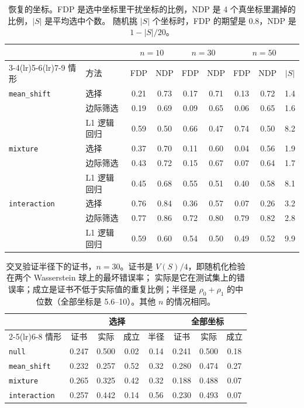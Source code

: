 \documentclass[11pt,a4paper,fontset=none]{ctexart}
\theoremstyle{definition}
\begin{document}
\begin{table}[htbp]
\centering\small
\begin{tabular}{llccccccc}
\toprule
& & \multicolumn{2}{c}{$n=10$} & \multicolumn{2}{c}{$n=30$} & \multicolumn{3}{c}{$n=50$}\\
\cmidrule(lr){3-4}\cmidrule(lr){5-6}\cmidrule(lr){7-9}
情形 & 方法 & FDP & NDP & FDP & NDP & FDP & NDP & $|S|$\\
\midrule
\texttt{mean\_shift} & 选择 & 0.21 & 0.73 & 0.17 & 0.71 & 0.13 & 0.72 & 1.4\\
& 边际筛选 & 0.19 & 0.69 & 0.09 & 0.65 & 0.06 & 0.65 & 1.6\\
& L1 逻辑回归 & 0.59 & 0.50 & 0.66 & 0.47 & 0.74 & 0.50 & 8.2\\
\texttt{mixture} & 选择 & 0.37 & 0.70 & 0.11 & 0.60 & 0.04 & 0.56 & 1.9\\
& 边际筛选 & 0.43 & 0.72 & 0.15 & 0.67 & 0.07 & 0.64 & 1.7\\
& L1 逻辑回归 & 0.45 & 0.68 & 0.55 & 0.51 & 0.40 & 0.58 & 8.1\\
\texttt{interaction} & 选择 & 0.76 & 0.84 & 0.36 & 0.57 & 0.07 & 0.26 & 3.2\\
& 边际筛选 & 0.77 & 0.86 & 0.72 & 0.80 & 0.79 & 0.82 & 2.8\\
& L1 逻辑回归 & 0.59 & 0.60 & 0.54 & 0.50 & 0.49 & 0.52 & 9.9\\
\bottomrule
\end{tabular}
\caption{恢复的坐标。FDP 是选中坐标里干扰坐标的比例，NDP 是 4 个真坐标里漏掉的比例，$|S|$ 是平均选中个数。
随机挑 $|S|$ 个坐标时，FDP 的期望是 0.8，NDP 是 $1-|S|/20$。}
\label{tab:recovery}
\end{table}

\begin{table}[htbp]
\centering\small
\begin{tabular}{lccccccc}
\toprule
& \multicolumn{4}{c}{选择} & \multicolumn{3}{c}{全部坐标}\\
\cmidrule(lr){2-5}\cmidrule(lr){6-8}
情形 & 证书 & 实际 & 成立 & 半径 & 证书 & 实际 & 成立\\
\midrule
\texttt{null} & 0.247 & 0.500 & 0.02 & 0.14 & 0.241 & 0.500 & 0.18\\
\texttt{mean\_shift} & 0.232 & 0.257 & 0.52 & 0.32 & 0.280 & 0.474 & 0.27\\
\texttt{mixture} & 0.265 & 0.325 & 0.42 & 0.32 & 0.188 & 0.488 & 0.07\\
\texttt{interaction} & 0.257 & 0.442 & 0.14 & 0.56 & 0.230 & 0.493 & 0.07\\
\bottomrule
\end{tabular}
\caption{交叉验证半径下的证书，$n=30$。证书是 $V(S)/4$，即随机化检验在两个 Wasserstein 球上的最坏错误率；
实际是它在测试集上的错误率；成立是证书不低于实际值的重复比例；半径是 $\rho_0+\rho_1$ 的中位数（全部坐标是 5.6--10）。其他 $n$ 的情况相同。}
\label{tab:cert}
\end{table}
\end{document}
